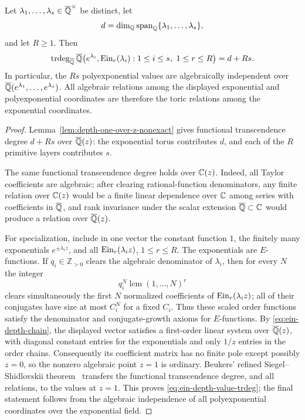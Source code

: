 \begin{theorem}
\label{thm:ein-depth-multipoint}
Let \(\lambda_1,\ldots,\lambda_s\in\overline{\mathbb Q}^\times\) be distinct, let
\[
 d=\dim_{\mathbb Q}\operatorname{span}_{\mathbb Q}
   \{\lambda_1,\ldots,\lambda_s\},
\]
and let \(R\geq1\).  Then
\begin{equation}\label{eq:ein-depth-value-trdeg}
 \operatorname{trdeg}_{\overline{\mathbb Q}}
 \overline{\mathbb Q}\bigl(
   e^{\lambda_i},\operatorname{Ein}_{r}(\lambda_i):
   1\leq i\leq s,\ 1\leq r\leq R
 \bigr)
 =d+Rs.
\end{equation}
In particular, the \(Rs\) polyexponential values are algebraically independent over
\(\overline{\mathbb Q}(e^{\lambda_1},\ldots,e^{\lambda_s})\).  All algebraic relations
among the displayed exponential and polyexponential coordinates are therefore the
toric relations among the exponential coordinates.
\end{theorem}

\begin{proof}
Lemma~\ref{lem:depth-one-over-z-nonexact} gives functional transcendence
degree \(d+Rs\) over \(\overline{\mathbb Q}(z)\): the exponential torus contributes
\(d\), and each of the \(R\) primitive layers contributes \(s\).

The same functional transcendence degree holds over \(\mathbb C(z)\).  Indeed,
all Taylor coefficients are algebraic; after clearing rational-function
denominators, any finite relation over \(\mathbb C(z)\) would be a finite linear
dependence over \(\mathbb C\) among series with coefficients in \(\overline{\mathbb Q}\), and
rank invariance under the scalar extension \(\overline{\mathbb Q}\subset\mathbb C\) would produce
a relation over \(\overline{\mathbb Q}(z)\).

For specialization, include in one vector the constant function \(1\),
the finitely many exponentials \(e^{\pm\lambda_i z}\), and all
\(\operatorname{Ein}_{r}(\lambda_i z)\), \(1\leq r\leq R\).  The exponentials are
\(E\)-functions.  If \(q_i\in\mathbb Z_{>0}\) clears the algebraic
denominator of \(\lambda_i\), then for every \(N\) the integer
\[
 q_i^N\operatorname{lcm}(1,\ldots,N)^r
\]
clears simultaneously the first \(N\) normalized coefficients of
\(\operatorname{Ein}_{r}(\lambda_i z)\); all of their conjugates have size at most
\(C_i^N\) for a fixed \(C_i\).  Thus these scaled order functions satisfy
the denominator and conjugate-growth axioms for \(E\)-functions.  By
\eqref{eq:ein-depth-chain}, the displayed vector satisfies a first-order
linear system over \(\overline{\mathbb Q}(z)\), with diagonal constant entries for the
exponentials and only \(1/z\) entries in the order chains.  Consequently
its coefficient matrix has no finite pole except possibly \(z=0\), so the
nonzero algebraic point \(z=1\) is ordinary.  Beukers'
refined Siegel--Shidlovskii theorem~\cite{Beukers2006} transfers the functional
transcendence degree, and all relations, to the values at \(z=1\).  This
proves \eqref{eq:ein-depth-value-trdeg}; the final statement follows from
the algebraic independence of all polyexponential coordinates over the exponential
field.
\end{proof}

